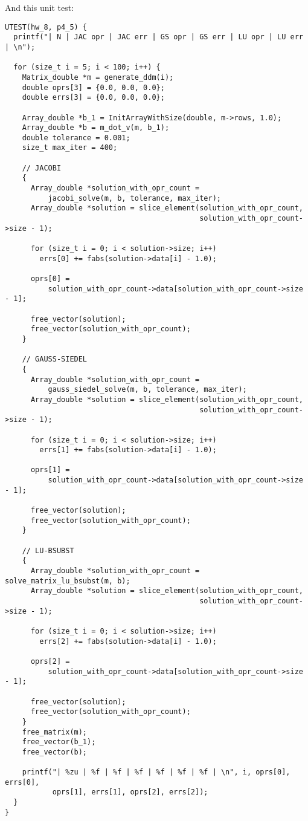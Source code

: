 \documentclass[11pt]{article}
\begin{document}
And this unit test:
\begin{verbatim}
UTEST(hw_8, p4_5) {
  printf("| N | JAC opr | JAC err | GS opr | GS err | LU opr | LU err | \n");

  for (size_t i = 5; i < 100; i++) {
    Matrix_double *m = generate_ddm(i);
    double oprs[3] = {0.0, 0.0, 0.0};
    double errs[3] = {0.0, 0.0, 0.0};

    Array_double *b_1 = InitArrayWithSize(double, m->rows, 1.0);
    Array_double *b = m_dot_v(m, b_1);
    double tolerance = 0.001;
    size_t max_iter = 400;

    // JACOBI
    {
      Array_double *solution_with_opr_count =
          jacobi_solve(m, b, tolerance, max_iter);
      Array_double *solution = slice_element(solution_with_opr_count,
                                             solution_with_opr_count->size - 1);

      for (size_t i = 0; i < solution->size; i++)
        errs[0] += fabs(solution->data[i] - 1.0);

      oprs[0] =
          solution_with_opr_count->data[solution_with_opr_count->size - 1];

      free_vector(solution);
      free_vector(solution_with_opr_count);
    }

    // GAUSS-SIEDEL
    {
      Array_double *solution_with_opr_count =
          gauss_siedel_solve(m, b, tolerance, max_iter);
      Array_double *solution = slice_element(solution_with_opr_count,
                                             solution_with_opr_count->size - 1);

      for (size_t i = 0; i < solution->size; i++)
        errs[1] += fabs(solution->data[i] - 1.0);

      oprs[1] =
          solution_with_opr_count->data[solution_with_opr_count->size - 1];

      free_vector(solution);
      free_vector(solution_with_opr_count);
    }

    // LU-BSUBST
    {
      Array_double *solution_with_opr_count = solve_matrix_lu_bsubst(m, b);
      Array_double *solution = slice_element(solution_with_opr_count,
                                             solution_with_opr_count->size - 1);

      for (size_t i = 0; i < solution->size; i++)
        errs[2] += fabs(solution->data[i] - 1.0);

      oprs[2] =
          solution_with_opr_count->data[solution_with_opr_count->size - 1];

      free_vector(solution);
      free_vector(solution_with_opr_count);
    }
    free_matrix(m);
    free_vector(b_1);
    free_vector(b);

    printf("| %zu | %f | %f | %f | %f | %f | %f | \n", i, oprs[0], errs[0],
           oprs[1], errs[1], oprs[2], errs[2]);
  }
}
\end{verbatim}
\end{document}
